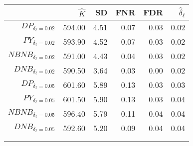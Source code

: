 \documentclass[portrait,a0b,final]{a0poster}
\newenvironment{poster}{
  \begin{center}
  \begin{minipage}[c]{0.98\textwidth}
}{
  \end{minipage}
  \end{center}
}
\newcommand{\pbox}[4]{
\psshadowbox[#3]{
\begin{minipage}[t][#2][t]{#1}
#4
\end{minipage}
}}
\begin{document}
\begin{poster}
\begin{multicols}{3}
\begin{center}
\begin{tabular}{rrrrrr}
\hline
& $\hat{K}$ & SD & FNR & FDR & $\hat{\delta}_{\ell}$ \\ 
\hline
$DP_{\delta_{\ell} = 0.02}$ & 594.00 & 4.51 & 0.07 & 0.03 & 0.02 \\ 
$PY_{\delta_{\ell} = 0.02}$ & 593.90 & 4.52 & 0.07 & 0.03 & 0.02  \\ 
$NBNB_{\delta_{\ell} = 0.02}$ & 591.00 & 4.43 & 0.04 & 0.03 & 0.02 \\ 
$DNB_{\delta_{\ell} = 0.02}$ & 590.50 & 3.64 & 0.03 & 0.00 & 0.02 \\ \hline
$DP_{\delta_{\ell} = 0.05}$ & 601.60 & 5.89 & 0.13 & 0.03 & 0.03 \\ 
$PY_{\delta_{\ell} = 0.05}$ & 601.50 & 5.90 & 0.13 & 0.03 & 0.04 \\ 
$NBNB_{\delta_{\ell} = 0.05}$ & 596.40 & 5.79 & 0.11 & 0.04 & 0.04 \\ 
$DNB_{\delta_{\ell} = 0.05}$ & 592.60 & 5.20 & 0.09 & 0.04 & 0.04 \\ \hline\\
\label{tab:italy}
\end{tabular}
\vspace{-2cm}
\end{center}

\vspace{.25cm}\begin{center}\pbox{0.8\columnwidth}{}{linewidth=2mm,framearc=0.1,linecolor=lightblue,
fillstyle=gradient,gradangle=0,gradbegin=white,gradend=whiteblue,gradmidpoint=1.0,framesep=1em}
{\begin{center}{\large \bf Discussion}\end{center}}\end{center}\vspace{.3cm}
\vspace*{1em}


\end{multicols}
\end{poster}
\end{document}
